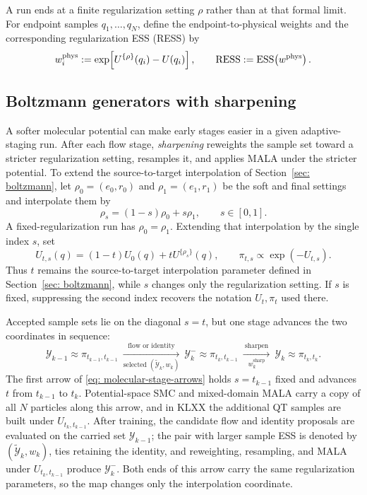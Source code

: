 \documentclass{article}
\begin{document}
A run ends at a finite regularization setting \(\rho\) rather than at that formal limit. For endpoint samples $q_1,\ldots,q_N$, define the endpoint-to-physical weights and the corresponding regularization ESS (RESS) by
\begin{equation}
w_i^{\mathrm{phys}}
:=\exp\!\left[U^{\{\rho\}}(q_i)-U(q_i)\right],
\qquad
\operatorname{RESS}:=\mathrm{ESS}\!\left(w^{\mathrm{phys}}\right).
\label{eq: molecular-ress}
\end{equation}

\subsection{Boltzmann generators with sharpening}
\label{sec: mol-sharpening}

A softer molecular potential can make early stages easier in a given adaptive-staging run. After each flow stage, \emph{sharpening} reweights the sample set toward a stricter regularization setting, resamples it, and applies MALA under the stricter potential. To extend the source-to-target interpolation of Section~\ref{sec: boltzmann}, let $\rho_0=(e_0,r_0)$ and $\rho_1=(e_1,r_1)$ be the soft and final settings and interpolate them by
\begin{equation*}
\rho_s=(1-s)\rho_0+s\rho_1,
\qquad s\in[0,1].
\end{equation*}
A fixed-regularization run has \(\rho_0=\rho_1\). Extending that interpolation by the single index \(s\), set
\begin{equation*}
U_{t,s}(q)=(1-t)U_0(q)+tU^{\{\rho_s\}}(q),
\qquad
\pi_{t,s}\propto\exp(-U_{t,s}).
\end{equation*}
Thus \(t\) remains the source-to-target interpolation parameter defined in Section~\ref{sec: boltzmann}, while \(s\) changes only the regularization setting. If \(s\) is fixed, suppressing the second index recovers the notation \(U_t,\pi_t\) used there.

Accepted sample sets lie on the diagonal $s=t$, but one stage advances the two coordinates in sequence:
\begin{equation}
\mathcal Y_{k-1}\approx\pi_{t_{k-1},t_{k-1}}
\ \xrightarrow[
    \text{selected }(\tilde{\mathcal Y}_k,w_k)
]{\ \text{flow or identity}\ }\
\mathcal Y_k^-\approx\pi_{t_k,t_{k-1}}
\ \xrightarrow[
    w_k^{\mathrm{sharp}}
]{\ \text{sharpen}\ }\
\mathcal Y_k\approx\pi_{t_k,t_k}.
\label{eq: molecular-stage-arrows}
\end{equation}
The first arrow of \eqref{eq: molecular-stage-arrows} holds $s=t_{k-1}$ fixed and advances $t$ from $t_{k-1}$ to $t_k$. Potential-space SMC and mixed-domain MALA carry a copy of all $N$ particles along this arrow, and in KLXX the additional QT samples are built under $U_{t_k,t_{k-1}}$. After training, the candidate flow and identity proposals are evaluated on the carried set $\mathcal Y_{k-1}$; the pair with larger sample ESS is denoted by $(\tilde{\mathcal Y}_k,w_k)$, ties retaining the identity, and reweighting, resampling, and MALA under $U_{t_k,t_{k-1}}$ produce $\mathcal Y_k^-$. Both ends of this arrow carry the same regularization parameters, so the map changes only the interpolation coordinate.
\end{document}
